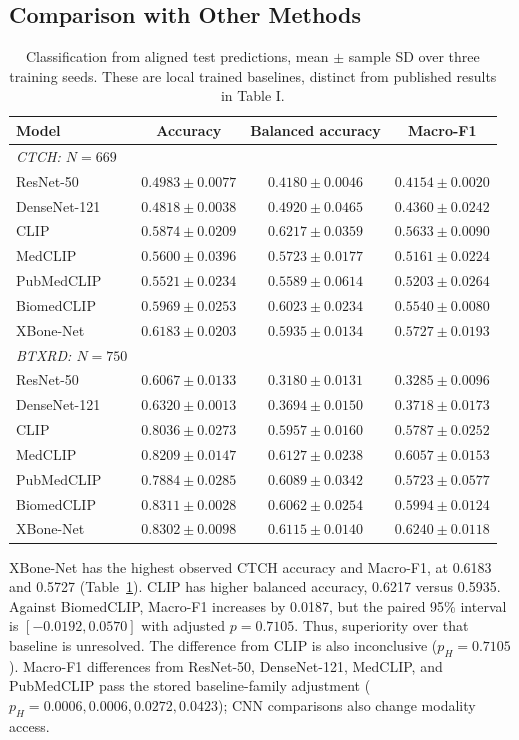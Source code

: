 \documentclass[conference,a4paper]{IEEEtran}
\begin{document}
\subsection{Comparison with Other Methods}
\begin{table}[t]
\caption{Classification from aligned test predictions, mean $\pm$ sample SD over three training seeds. These are local trained baselines, distinct from published results in Table I.}
\label{tab:classification}
\centering\small
\begin{tabular}{@{}lccc@{}}
\toprule
Model & Accuracy & Balanced accuracy & Macro-F1 \\
\midrule
\textit{CTCH: $N=669$} & & & \\
ResNet-50 & $0.4983\pm0.0077$ & $0.4180\pm0.0046$ & $0.4154\pm0.0020$\\
DenseNet-121 & $0.4818\pm0.0038$ & $0.4920\pm0.0465$ & $0.4360\pm0.0242$\\
CLIP & $0.5874\pm0.0209$ & $0.6217\pm0.0359$ & $0.5633\pm0.0090$\\
MedCLIP & $0.5600\pm0.0396$ & $0.5723\pm0.0177$ & $0.5161\pm0.0224$\\
PubMedCLIP & $0.5521\pm0.0234$ & $0.5589\pm0.0614$ & $0.5203\pm0.0264$\\
BiomedCLIP & $0.5969\pm0.0253$ & $0.6023\pm0.0234$ & $0.5540\pm0.0080$\\
XBone-Net & $0.6183\pm0.0203$ & $0.5935\pm0.0134$ & $0.5727\pm0.0193$\\
\midrule
\textit{BTXRD: $N=750$} & & & \\
ResNet-50 & $0.6067\pm0.0133$ & $0.3180\pm0.0131$ & $0.3285\pm0.0096$\\
DenseNet-121 & $0.6320\pm0.0013$ & $0.3694\pm0.0150$ & $0.3718\pm0.0173$\\
CLIP & $0.8036\pm0.0273$ & $0.5957\pm0.0160$ & $0.5787\pm0.0252$\\
MedCLIP & $0.8209\pm0.0147$ & $0.6127\pm0.0238$ & $0.6057\pm0.0153$\\
PubMedCLIP & $0.7884\pm0.0285$ & $0.6089\pm0.0342$ & $0.5723\pm0.0577$\\
BiomedCLIP & $0.8311\pm0.0028$ & $0.6062\pm0.0254$ & $0.5994\pm0.0124$\\
XBone-Net & $0.8302\pm0.0098$ & $0.6115\pm0.0140$ & $0.6240\pm0.0118$\\
\bottomrule
\end{tabular}
\end{table}

XBone-Net has the highest observed CTCH accuracy and Macro-F1, at 0.6183 and 0.5727 (Table~\ref{tab:classification}). CLIP has higher balanced accuracy, 0.6217 versus 0.5935. Against BiomedCLIP, Macro-F1 increases by 0.0187, but the paired 95\% interval is $[-0.0192,0.0570]$ with adjusted $p=0.7105$. Thus, superiority over that baseline is unresolved. The difference from CLIP is also inconclusive ($p_H=0.7105$). Macro-F1 differences from ResNet-50, DenseNet-121, MedCLIP, and PubMedCLIP pass the stored baseline-family adjustment ($p_H=0.0006,0.0006,0.0272,0.0423$); CNN comparisons also change modality access.
\end{document}
